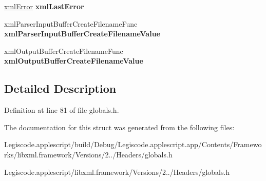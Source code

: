 \begin{DoxyCompactItemize}
\item 
\hypertarget{struct__xml_global_state_afd5f9c9dc58ab8f75fb0074370e18bbb}{\hyperlink{struct__xml_error}{xml\-Error} {\bfseries xml\-Last\-Error}}\label{struct__xml_global_state_afd5f9c9dc58ab8f75fb0074370e18bbb}

\item 
\hypertarget{struct__xml_global_state_a4426a58b33b2f1db58f66c4a01d1044c}{xml\-Parser\-Input\-Buffer\-Create\-Filename\-Func {\bfseries xml\-Parser\-Input\-Buffer\-Create\-Filename\-Value}}\label{struct__xml_global_state_a4426a58b33b2f1db58f66c4a01d1044c}

\item 
\hypertarget{struct__xml_global_state_ad9c2ba58bc1b222cd1189a265a137276}{xml\-Output\-Buffer\-Create\-Filename\-Func {\bfseries xml\-Output\-Buffer\-Create\-Filename\-Value}}\label{struct__xml_global_state_ad9c2ba58bc1b222cd1189a265a137276}

\end{DoxyCompactItemize}


\subsection{Detailed Description}


Definition at line 81 of file globals.\-h.



The documentation for this struct was generated from the following files\-:\begin{DoxyCompactItemize}
\item 
Legiscode.\-applescript/build/\-Debug/\-Legiscode.\-applescript.\-app/\-Contents/\-Frameworks/libxml.\-framework/\-Versions/2../\-Headers/globals.\-h\item 
Legiscode.\-applescript/libxml.\-framework/\-Versions/2../\-Headers/globals.\-h\end{DoxyCompactItemize}
